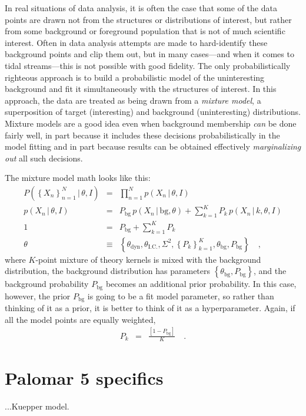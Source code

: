 \documentclass[12pt,pdftex,preprint]{aastex}
\newcommand{\setof}[1]{\left\{{#1}\right\}}
\newcommand{\given}{\,|\,}
\newcommand{\bg}{\mathrm{bg}}
\newcommand{\dyn}{\mathrm{dyn}}
\newcommand{\ic}{\mathrm{I.C.}}
\begin{document}
In real situations of data analysis, it is often the case that some of
the data points are drawn not from the structures or distributions of
interest, but rather from some background or foreground population
that is not of much scientific interest.  Often in data analysis
attempts are made to hard-identify these background points and clip
them out, but in many cases---and when it comes to tidal
streams---this is not possible with good fidelity.  The only
probabilistically righteous approach is to build a probabilistic model
of the uninteresting background and fit it simultaneously with the
structures of interest.  In this approach, the data are treated as
being drawn from a \emph{mixture model}, a superposition of target
(interesting) and background (uninteresting) distributions.  Mixture
models are a good idea even when background membership \emph{can} be
done fairly well, in part because it includes these decisions
probabilistically in the model fitting and in part because results can
be obtained effectively \emph{marginalizing out} all such decisions.

The mixture model math looks like this:
\begin{eqnarray}
P(\setof{X_n}_{n=1}^N\given\theta,I) &=& \prod_{n=1}^N p(X_n\given\theta,I)
\\
p(X_n\given\theta,I) &=& P_\bg\,p(X_n\given \bg,\theta) + \sum_{k=1}^K P_k\,p(X_n\given k,\theta,I)
\\
1 &=& P_\bg + \sum_{k=1}^K P_k
\\
\theta &\equiv& \setof{\theta_\dyn, \theta_\ic, \Sigma^2, \setof{P_k}_{k=1}^K, \theta_\bg, P_\bg}
\quad ,
\end{eqnarray}
where $K$-point mixture of theory kernels is mixed with the background
distribution, the background distribution has parameters
$\setof{\theta_\bg, P_\bg}$, and the background probability $P_\bg$
becomes an additional prior probability.  In this case, however, the
prior $P_\bg$ is going to be a fit model parameter, so rather than
thinking of it as a prior, it is better to think of it as a
hyperparameter.  Again, if all the model points are equally weighted,
\begin{eqnarray}
P_k &=& \frac{[1 - P_\bg]}{K}
\quad .
\end{eqnarray}

\section{Palomar 5 specifics}

...Kuepper model.
\end{document}
